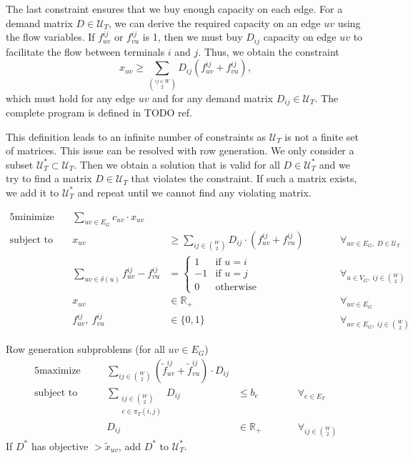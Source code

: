 The last constraint ensures that we buy enough capacity on each edge.
For a demand matrix $D \in \mathcal U_T$, we can derive the required capacity on an edge $uv$ using the flow variables.
If $f^{ij}_{uv}$ or $f^{ij}_{vu}$ is 1, then we must buy $D_{ij}$ capacity on edge $uv$ to facilitate the flow between terminals $i$ and $j$.
Thus, we obtain the constraint
\[
    x_{uv} \ge \sum_{ij \in W \choose 2} D_{ij} \left( f^{ij}_{uv} + f^{ij}_{vu} \right),
\]
which must hold for any edge $uv$ and for any demand matrix $D_{ij} \in \mathcal U_T$.
The complete program is defined in TODO ref. %

This definition leads to an infinite number of constraints as $\mathcal U_T$ is not a finite set of matrices.
This issue can be resolved with row generation.
We only consider a subset $\mathcal U_T^* \subset \mathcal U_T$.
Then we obtain a solution that is valid for all $D \in \mathcal U_T^*$ and we try to find a matrix $D \in \mathcal U_T$ that violates the constraint.
If such a matrix exists, we add it to $\mathcal U_T^*$ and repeat until we cannot find any violating matrix.



\begin{alignat*}{5}
    \text{minimize}\ && \sum_{uv \in E_G} c_{uv} \cdot x_{uv} &&& \\
    \text{subject to}\ && x_{uv} &\ge \sum_{ij \in \binom{W}{2}} D_{ij} \cdot (f_{uv}^{ij} + f_{vu}^{ij}) &&\qquad \forall_{uv \in E_G,\ D \in \mathcal U_T} \\
    && \sum_{uv \in \delta(u)} f_{uv}^{ij} - f_{vu}^{ij} &= \begin{cases}
                                                                1 & \text{if $u = i$} \\
                                                                -1 & \text{if $u = j$} \\
                                                                0 & \text{otherwise}
    \end{cases} &&\qquad \forall_{u \in V_G,\ ij \in \binom{W}{2}} \\
    && x_{uv} &\in \mathbb{R}_+ &&\qquad \forall_{uv \in E_G} \\
    && f_{uv}^{ij},\ f_{vu}^{ij} &\in \{ 0, 1 \} &&\qquad \forall_{uv \in E_G,\ ij \in \binom{W}{2}}
\end{alignat*}%


Row generation subproblems (for all $uv \in E_G$)
            \begin{alignat*}{5}
                \text{maximize}\quad && \sum_{ij \in \binom{W}{2}} (\tilde f_{uv}^{ij} + \tilde f_{vu}^{ij}) \cdot D_{ij} &&& \\
                \text{subject to}\quad && \sum_{\substack{ij \in \binom{W}{2}\\e \in \pi_T(i,j)}} D_{ij} &\le b_e &&\qquad \forall_{e \in E_T} \\
                && D_{ij} &\in \mathbb{R}_+ &&\qquad \forall_{ij \in \binom{W}{2}}
            \end{alignat*}
            If $D^*$ has objective $> \tilde x_{uv}$, add $D^*$ to $\mathcal U_T^*$.

